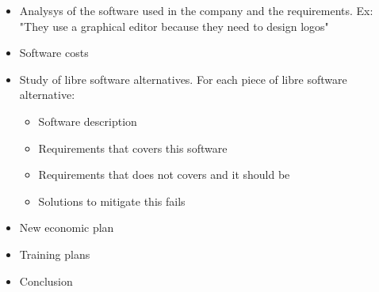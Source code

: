 \documentclass[a4paper]{article}
\begin{document}
\begin{itemize}
\item Analysys of the software used in the company and the requirements. Ex: "They use a graphical editor because they need to design logos"
\item Software costs
\item Study of libre software alternatives. For each piece of libre software alternative:
	\begin{itemize}
	\item Software description
	\item Requirements that covers this software
	\item Requirements that does not covers and it should be
	\item Solutions to mitigate this fails
	\end{itemize}
\item New economic plan
\item Training plans 
\item Conclusion

\end{itemize}
\end{document}
